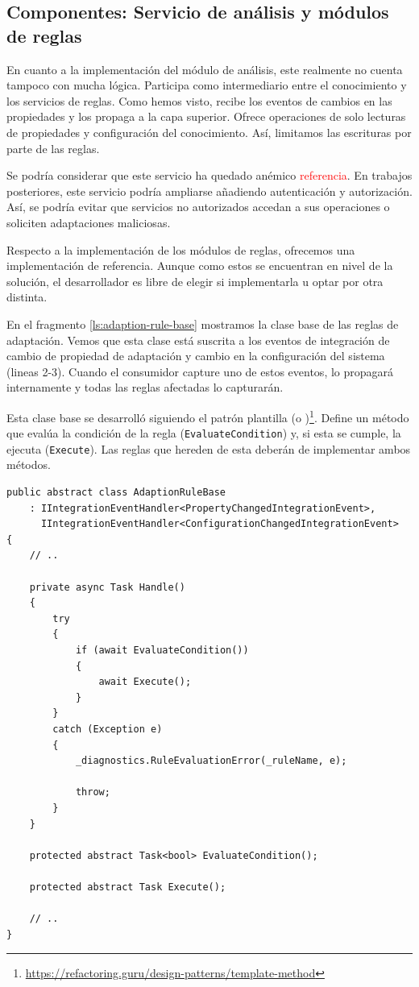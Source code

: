 \subsection{Componentes: Servicio de análisis y módulos de reglas}

En cuanto a la implementación del módulo de análisis, este realmente no cuenta tampoco con mucha lógica. Participa como intermediario entre el conocimiento y los servicios de reglas. Como hemos visto, recibe los eventos de cambios en las propiedades y los propaga a la capa superior. Ofrece operaciones de solo lecturas de propiedades y configuración del conocimiento. Así, limitamos las escrituras por parte de las reglas.

Se podría considerar que este servicio ha quedado anémico \textcolor{red}{referencia}. En trabajos posteriores, este servicio podría ampliarse añadiendo autenticación y autorización. Así, se podría evitar que servicios no autorizados accedan a sus operaciones o soliciten adaptaciones maliciosas.

Respecto a la implementación de los módulos de reglas, ofrecemos una implementación de referencia. Aunque como estos se encuentran en nivel de la solución, el desarrollador es libre de elegir si implementarla u optar por otra distinta.

En el fragmento \ref{ls:adaption-rule-base} mostramos la clase base de las reglas de adaptación. Vemos que esta clase está suscrita a los eventos de integración de cambio de propiedad de adaptación y cambio en la configuración del sistema (lineas 2-3). Cuando el consumidor capture uno de estos eventos, lo propagará internamente y todas las reglas afectadas lo capturarán.

Esta clase base se desarrolló siguiendo el patrón plantilla (o )\footnote{\url{https://refactoring.guru/design-patterns/template-method}}. Define un método que evalúa la condición de la regla (\texttt{EvaluateCondition}) y, si esta se cumple, la ejecuta (\texttt{Execute}). Las reglas que hereden de esta deberán de implementar ambos métodos.

\begin{lstlisting}[language={[Sharp]C},caption={Clase base para implementar reglas de adaptación. Se evalúa la condición, y si esta se cumple, se ejecuta.},captionpos=b, label=ls:adaption-rule-base]
public abstract class AdaptionRuleBase
    : IIntegrationEventHandler<PropertyChangedIntegrationEvent>,
      IIntegrationEventHandler<ConfigurationChangedIntegrationEvent>
{
    // ..

    private async Task Handle()
    {
        try
        {
            if (await EvaluateCondition())
            {
                await Execute();
            }
        }
        catch (Exception e)
        {
            _diagnostics.RuleEvaluationError(_ruleName, e);

            throw;
        }
    }

    protected abstract Task<bool> EvaluateCondition();

    protected abstract Task Execute();

    // ..
}
\end{lstlisting}

